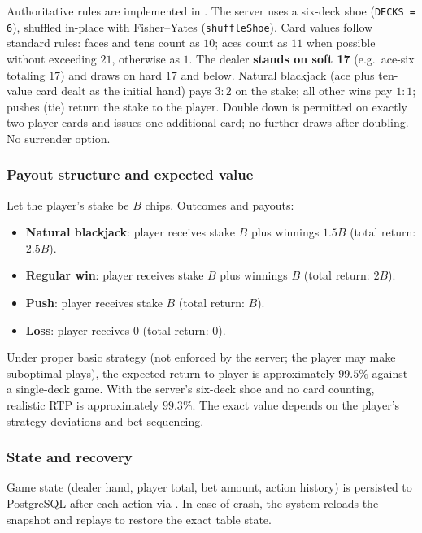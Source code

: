 \documentclass[11pt,a4paper]{article}
\begin{document}
Authoritative rules are implemented in . The server uses a six-deck shoe (\texttt{DECKS = 6}), shuffled in-place with Fisher--Yates (\texttt{shuffleShoe}). Card values follow standard rules: faces and tens count as $10$; aces count as $11$ when possible without exceeding $21$, otherwise as $1$. The dealer \textbf{stands on soft 17} (e.g.\ ace-six totaling $17$) and draws on hard $17$ and below. Natural blackjack (ace plus ten-value card dealt as the initial hand) pays $3{:}2$ on the stake; all other wins pay $1{:}1$; pushes (tie) return the stake to the player. Double down is permitted on exactly two player cards and issues one additional card; no further draws after doubling. No surrender option.

\subsubsection{Payout structure and expected value}

Let the player's stake be $B$ chips. Outcomes and payouts:
\begin{itemize}
\item \textbf{Natural blackjack}: player receives stake $B$ plus winnings $1.5 B$ (total return: $2.5 B$).
\item \textbf{Regular win}: player receives stake $B$ plus winnings $B$ (total return: $2 B$).
\item \textbf{Push}: player receives stake $B$ (total return: $B$).
\item \textbf{Loss}: player receives $0$ (total return: $0$).
\end{itemize}

Under proper basic strategy (not enforced by the server; the player may make suboptimal plays), the expected return to player is approximately $99.5\%$ against a single-deck game. With the server's six-deck shoe and no card counting, realistic RTP is approximately $99.3\%$. The exact value depends on the player's strategy deviations and bet sequencing.

\subsubsection{State and recovery}

Game state (dealer hand, player total, bet amount, action history) is persisted to PostgreSQL after each action via . In case of crash, the system reloads the snapshot and replays to restore the exact table state.
\end{document}
